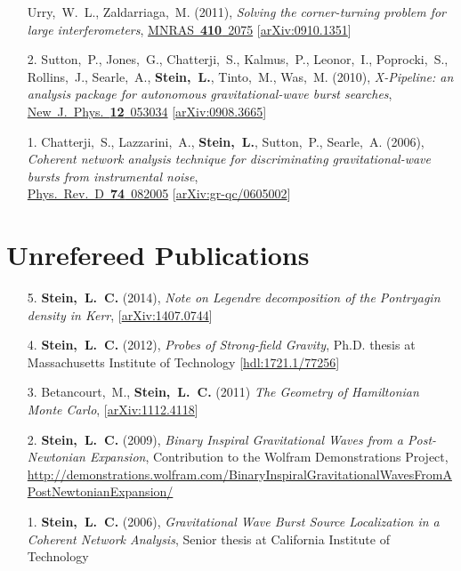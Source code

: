 \begin{enumerate}
  Urry,~W.~L., Zaldarriaga,~M. (2011), {\it Solving the
    corner-turning problem for large interferometers},
  \href{http://dx.doi.org/10.1111/j.1365-2966.2010.17587.x}{MNRAS~{\bf 410}~2075}
  [\href{http://arxiv.org/abs/0910.1351}{arXiv:0910.1351}]
\item[{2.}] Sutton,~P., Jones,~G., Chatterji,~S., Kalmus,~P., Leonor,~I.,
  Poprocki,~S., Rollins,~J., Searle,~A., {\bf Stein,~L.}, Tinto,~M.,
  Was,~M. (2010), {\it X-Pipeline: an analysis package for autonomous
    gravitational-wave burst searches},
  \href{http://dx.doi.org/10.1088/1367-2630/12/5/053034}{New~J.~Phys.~{\bf 12}~053034}
  [\href{http://arxiv.org/abs/0908.3665}{arXiv:0908.3665}]
\item[{1.}] Chatterji,~S., Lazzarini,~A., {\bf Stein,~L.}, Sutton,~P.,
  Searle,~A. (2006), {\it Coherent network analysis technique for
    discriminating gravitational-wave bursts from instrumental noise},\\
  \href{http://dx.doi.org/10.1103/PhysRevD.74.082005}{Phys.~Rev.~D~{\bf 74}~082005}
  [\href{http://arxiv.org/abs/gr-qc/0605002}{arXiv:gr-qc/0605002}]
\end{enumerate}

\section{\sc Unrefereed Publications}
\begin{enumerate}
\item[{5.}] {\bf Stein,~L.~C.} (2014), {\it Note on Legendre decomposition of the Pontryagin density in Kerr},
  [\href{http://arxiv.org/abs/1407.0744}{arXiv:1407.0744}]
\item[{4.}] {\bf Stein,~L.~C.} (2012), {\it Probes of Strong-field Gravity}, Ph.D. thesis at Massachusetts Institute of Technology
  [\href{http://hdl.handle.net/1721.1/77256}{hdl:1721.1/77256}]
\item[{3.}] Betancourt,~M., {\bf Stein,~L.~C.} (2011) {\it The
    Geometry of Hamiltonian Monte Carlo},
  [\href{http://arxiv.org/abs/1112.4118}{arXiv:1112.4118}]
\item[{2.}] {\bf Stein,~L.~C.} (2009), {\it Binary Inspiral
    Gravitational Waves from a Post-Newtonian Expansion}, Contribution
  to the Wolfram Demonstrations Project, \url{http://demonstrations.wolfram.com/BinaryInspiralGravitationalWavesFromAPostNewtonianExpansion/}
\item[{1.}] {\bf Stein,~L.~C.} (2006), {\it Gravitational Wave Burst Source Localization in a Coherent Network Analysis}, Senior thesis at California Institute of Technology
\end{enumerate}


